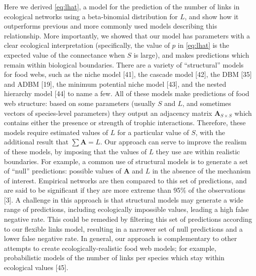 \documentclass[12pt]{article}
\begin{document}
Here we derived \cref{eq:lhat}, a model for the prediction of the number
of links in ecological networks using a beta-binomial distribution for
\(L\), and show how it outperforms previous and more commonly used
models describing this relationship. More importantly, we showed that
our model has parameters with a clear ecological interpretation
(specifically, the value of \(p\) in \cref{eq:lhat} is the expected
value of the connectance when \(S\) is large), and makes predictions
which remain within biological boundaries. There are a variety of
``structural'' models for food webs, such as the niche model {[}41{]},
the cascade model {[}42{]}, the DBM {[}35{]} and ADBM {[}19{]}, the
minimum potential niche model {[}43{]}, and the nested hierarchy model
{[}44{]} to name a few. All of these models make predictions of food web
structure: based on some parameters (usually \(S\) and \(L\), and
sometimes vectors of species-level parameters) they output an adjacency
matrix \(\mathbf{A}_{S\times S}\) which contains either the presence or
strength of trophic interactions. Therefore, these models require
estimated values of \(L\) for a particular value of \(S\), with the
additional result that \(\sum \mathbf{A} = L\). Our approach can serve
to improve the realism of these models, by imposing that the values of
\(L\) they use are within realistic boundaries. For example, a common
use of structural models is to generate a set of ``null'' predictions:
possible values of \(\mathbf{A}\) and \(L\) in the absence of the
mechanism of interest. Empirical networks are then compared to this set
of predictions, and are said to be significant if they are more extreme
than 95\% of the observations {[}3{]}. A challenge in this approach is
that structural models may generate a wide range of predictions,
including ecologically impossible values, leading a high false negative
rate. This could be remedied by filtering this set of predictions
according to our flexible links model, resulting in a narrower set of
null predictions and a lower false negative rate. In general, our
approach is complementary to other attempts to create
ecologically-realistic food web models; for example, probabilistic
models of the number of links per species which stay within ecological
values {[}45{]}.
\end{document}
